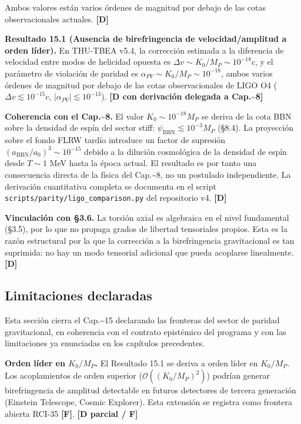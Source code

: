 ﻿\documentclass[11pt,letterpaper]{article}
\begin{document}
Ambos valores están varios órdenes de magnitud por debajo de las cotas observacionales actuales. \textbf{[D]}

\textbf{Resultado 15.1 (Ausencia de birefringencia de velocidad/amplitud a orden líder).} En THU-TBEA v5.4, la corrección estimada a la diferencia de velocidad entre modos de helicidad opuesta es $\Delta v \sim K_0/M_P \sim 10^{-18}c$, y el parámetro de violación de paridad es $\alpha_{PV} \sim K_0/M_P \sim 10^{-18}$, ambos varios órdenes de magnitud por debajo de las cotas observacionales de LIGO O4 ($\Delta v \lesssim 10^{-15}c$, $|\alpha_{PV}| \lesssim 10^{-13}$). \textbf{[D con derivación delegada a Cap.\textasciitilde{}8]}

\textbf{Coherencia con el Cap.\textasciitilde{}8.} El valor $K_0 \sim 10^{-18}M_P$ se deriva de la cota BBN sobre la densidad de espín del sector stiff: $\psi_{\text{BBN}} \lesssim 10^{-3}M_P$ (§8.4). La proyección sobre el fondo FLRW tardío introduce un factor de supresión $(a_{\text{BBN}}/a_0)^3 \sim 10^{-15}$ debido a la dilución cosmológica de la densidad de espín desde $T \sim 1$ MeV hasta la época actual. El resultado es por tanto una consecuencia directa de la física del Cap.\textasciitilde{}8, no un postulado independiente. La derivación cuantitativa completa se documenta en el script \texttt{scripts/parity/ligo\_comparison.py} del repositorio v4. \textbf{[D]}

\textbf{Vinculación con §3.6.} La torsión axial es algebraica en el nivel fundamental (§3.5), por lo que no propaga grados de libertad tensoriales propios. Esta es la razón estructural por la que la corrección a la birefringencia gravitacional es tan suprimida: no hay un modo tensorial adicional que pueda acoplarse linealmente. \textbf{[D]}
\subsection{Limitaciones declaradas}
Esta sección cierra el Cap.\textasciitilde{}15 declarando las fronteras del sector de paridad gravitacional, en coherencia con el contrato epistémico del programa y con las limitaciones ya enunciadas en los capítulos precedentes.

\textbf{Orden líder en $K_0/M_P$.} El Resultado 15.1 se deriva a orden líder en $K_0/M_P$. Los acoplamientos de orden superior ($\mathcal{O}((K_0/M_P)^2)$) podrían generar birefringencia de amplitud detectable en futuros detectores de tercera generación (Einstein Telescope, Cosmic Explorer). Esta extensión se registra como frontera abierta RCI-35 \textbf{[F]}. \textbf{[D parcial / F]}
\end{document}
